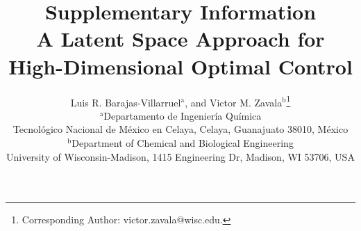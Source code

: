 \documentclass[11pt,twoside]{article}
\begin{document}
\title{{\bfseries Supplementary Information}\\[0.25em]
  {\large A Latent Space Approach for High-Dimensional Optimal Control}}

\author{
  Luis R. Barajas-Villarruel$^\text{a}$, and Victor M. Zavala$^\text{b}$\thanks{Corresponding Author: victor.zavala@wisc.edu.}\\
  {\small $^\text{a}$Departamento de Ingeniería Química}\\
  {\small \;Tecnológico Nacional de México en Celaya, Celaya, Guanajuato 38010, México}\\
  {\small $^\text{b}$Department of Chemical and Biological Engineering}\\
  {\small \;University of Wisconsin-Madison, 1415 Engineering Dr, Madison, WI 53706, USA}
}

\date{}
\maketitle
\newpage

\clearpage
\pagestyle{plain}
\thispagestyle{plain}
\end{document}
